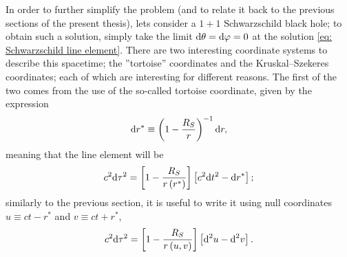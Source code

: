 In order to further simplify the problem (and to relate it back to the previous sections of the present thesis), lets consider a $1+1$ Schwarzschild black hole; to obtain such a solution, simply take the limit $\text{d}\theta=\text{d}\varphi=0$ at the solution \ref{eq: Schwarzschild line element}. There are two interesting coordinate systems to describe this spacetime; the ''tortoise'' coordinates and the Kruskal–Szekeres coordinates; each of which are interesting for different reasons. The first of the two comes from the use of the so-called tortoise coordinate, given by the expression
\begin{equation}\label{eq: Tortoise coordinate diff}
	\text{d} r^*\equiv \left(1-\frac{R_S}{r}\right)^{-1}\text{d} r,
\end{equation}
meaning that the line element will be
\begin{equation}
	c^2\text{d}\tau^2=\left[1-\frac{R_S}{r\left(r^*\right)}\right]\left[c^2\text{d} t^2-\text{d} r^*\right];
\end{equation}
similarly to the previous section, it is useful to write it using null coordinates $u\equiv ct-r^*$ and $v\equiv ct+r^*$,
\begin{equation}
	c^2\text{d}\tau^2=\left[1-\frac{R_S}{r\left(u,v\right)}\right]\left[\text{d}^2 u-\text{d}^2 v\right].
\end{equation}

